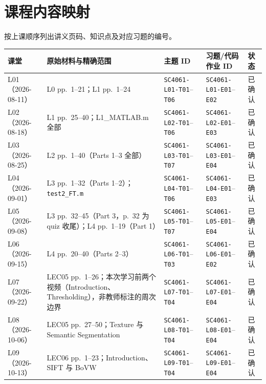 \section{课程内容映射}

按上课顺序列出讲义页码、知识点及对应习题的编号。

\begingroup
\linespread{1.18}\footnotesize
\setlength{\tabcolsep}{3pt}
\begin{tabularx}{\textwidth}{@{}>{\raggedright\arraybackslash}p{2.35cm}>{\raggedright\arraybackslash}X>{\raggedright\arraybackslash}p{3.15cm}>{\raggedright\arraybackslash}p{3.15cm}>{\raggedright\arraybackslash}p{1.25cm}@{}}
  \toprule
  课堂 & 原始材料与精确范围 & 主题 ID & 习题/代码作业 ID & 状态 \\
  \midrule
  L01（2026-08-11） & L0 pp.~1--21；L1 pp.~1--24
  & \texttt{SC4061-L01-T01}--\texttt{T06}
  & \texttt{SC4061-L01-E01}--\texttt{E02}
  & 已确认 \\
  L02（2026-08-18） & L1 pp.~25--40；L1\_MATLAB.m 全部
  & \texttt{SC4061-L02-T01}--\texttt{T06}
  & \texttt{SC4061-L02-E01}--\texttt{E03}
  & 已确认 \\
  L03（2026-08-25） & L2 pp.~1--40（Parts 1--3 全部）
  & \texttt{SC4061-L03-T01}--\texttt{T07}
  & \texttt{SC4061-L03-E01}--\texttt{E04}
  & 已确认 \\
  L04（2026-09-01） & L3 pp.~1--32（Parts 1--2）；\texttt{test2\_FT.m}
  & \texttt{SC4061-L04-T01}--\texttt{T06}
  & \texttt{SC4061-L04-E01}--\texttt{E03}
  & 已确认 \\
  L05（2026-09-08） & L3 pp.~32--45（Part 3，p.~32 为 quiz 收尾）；L4 pp.~1--19（Part 1）
  & \texttt{SC4061-L05-T01}--\texttt{T07}
  & \texttt{SC4061-L05-E01}--\texttt{E04}
  & 已确认 \\
  L06（2026-09-15） & L4 pp.~20--40（Parts 2--3）
  & \texttt{SC4061-L06-T01}--\texttt{T03}
  & \texttt{SC4061-L06-E01}--\texttt{E02}
  & 已确认 \\
  L07（2026-09-22） & LEC05 pp.~1--26；本次学习前两个视频（Introduction、Thresholding），非教师标注的周次边界
  & \texttt{SC4061-L07-T01}--\texttt{T04}
  & \texttt{SC4061-L07-E01}--\texttt{E04}
  & 已确认 \\
  L08（2026-10-06） & LEC05 pp.~27--50；Texture 与 Semantic Segmentation
  & \texttt{SC4061-L08-T01}--\texttt{T04}
  & \texttt{SC4061-L08-E01}--\texttt{E04}
  & 已确认 \\
  L09（2026-10-13） & LEC06 pp.~1--23；Introduction、SIFT 与 BoVW
  & \texttt{SC4061-L09-T01}--\texttt{T04}
  & \texttt{SC4061-L09-E01}--\texttt{E04}
  & 已确认 \\

\end{tabularx}
